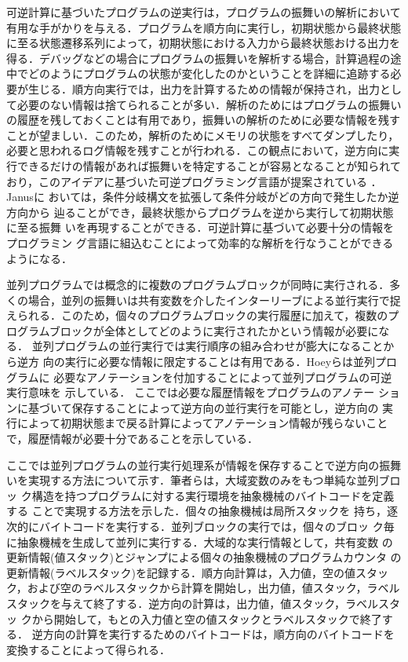 \documentclass[submit,PRO]{ipsj}
\begin{document}
可逆計算に基づいたプログラムの逆実行は，プログラムの振舞いの解析において
有用な手がかりを与える．プログラムを順方向に実行し，初期状態から最終状態
に至る状態遷移系列によって，初期状態における入力から最終状態おける出力を
得る．デバッグなどの場合にプログラムの振舞いを解析する場合，計算過程の途
中でどのようにプログラムの状態が変化したのかということを詳細に追跡する必
要が生じる．順方向実行では，出力を計算するための情報が保持され，出力とし
て必要のない情報は捨てられることが多い．解析のためにはプログラムの振舞い
の履歴を残しておくことは有用であり，振舞いの解析のために必要な情報を残す
ことが望ましい．このため，解析のためにメモリの状態をすべてダンプしたり，
必要と思われるログ情報を残すことが行われる．この観点において，逆方向に実
行できるだけの情報があれば振舞いを特定することが容易となることが知られて
おり，このアイデアに基づいた可逆プログラミング言語が提案されている
\cite{DBLP:journals/entcs/Yokoyama10,DBLP:conf/ifl/ThomsenA15}．Janusに
おいては，条件分岐構文を拡張して条件分岐がどの方向で発生したか逆方向から
辿ることができ，最終状態からプログラムを逆から実行して初期状態に至る振舞
いを再現することができる．可逆計算に基づいて必要十分の情報をプログラミン
グ言語に組込むことによって効率的な解析を行なうことができるようになる．

並列プログラムでは概念的に複数のプログラムブロックが同時に実行される．多
くの場合，並列の振舞いは共有変数を介したインターリーブによる並行実行で捉
えられる．このため，個々のプログラムブロックの実行履歴に加えて，複数のプ
ログラムブロックが全体としてどのように実行されたかという情報が必要になる．
並列プログラムの並行実行では実行順序の組み合わせが膨大になることから逆方
向の実行に必要な情報に限定することは有用である．Hoeyらは並列プログラムに
必要なアノテーションを付加することによって並列プログラムの可逆実行意味を
示している\cite{DBLP:journals/corr/abs-1808-08651,Hoey20PHD}．
ここでは必要な履歴情報をプログラムのアノテー
ションに基づいて保存することによって逆方向の並行実行を可能とし，逆方向の
実行によって初期状態まで戻る計算によってアノテーション情報が残らないこと
で，履歴情報が必要十分であることを示している．

ここでは並列プログラムの並行実行処理系が情報を保存することで逆方向の振舞
いを実現する方法について示す．筆者らは，大域変数のみをもつ単純な並列ブロッ
ク構造を持つプログラムに対する実行環境を抽象機械のバイトコードを定義する
ことで実現する方法を示した\cite{DBLP:conf/rc/IkedaY20}．個々の抽象機械は局所スタックを
持ち，逐次的にバイトコードを実行する．並列ブロックの実行では，個々のブロッ
ク毎に抽象機械を生成して並列に実行する．大域的な実行情報として，共有変数
の更新情報(値スタック)とジャンプによる個々の抽象機械のプログラムカウンタ
の更新情報(ラベルスタック)を記録する．順方向計算は，入力値，空の値スタッ
ク，および空のラベルスタックから計算を開始し，出力値，値スタック，ラベル
スタックを与えて終了する．逆方向の計算は，出力値，値スタック，ラベルスタッ
クから開始して，もとの入力値と空の値スタックとラベルスタックで終了する．
逆方向の計算を実行するためのバイトコードは，順方向のバイトコードを
変換することによって得られる．
\end{document}
